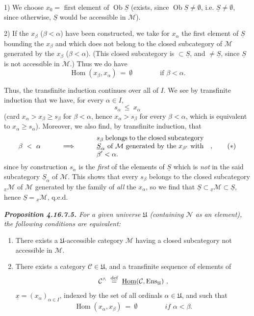 \documentclass[11pt]{article}
\newcommand{\printedpage}[1]{\marginpar{\footnotesize p.~#1}}
\newcommand{\msp}[1]{\marginpar{\footnotesize [#1]}}
\newcommand{\Ob}{\operatorname{Ob}}
\newcommand{\Hom}{\operatorname{Hom}}
\newcommand{\cM}{\mathcal{M}}
\newcommand{\cC}{\mathcal{C}}
\newcommand{\uS}{\underline{S}}
\newcommand{\U}{\mathfrak{U}}
\begin{document}
1) We choose $x_0 =$ first element of $\Ob \uS$ (exists, since $\Ob \uS \neq \emptyset$, i.e. $\uS \neq \emptyset$, since otherwise, $\uS$ would be accessible in $\cM$).

2) If the $x_\beta$ ($\beta < \alpha$) have been constructed, we take for $x_\alpha$ the first element of $\uS$ bounding the $x_\beta$ and which does not belong to the closed subcategory of $\cM$ generated by the $x_\beta$ ($\beta < \alpha$). (This closed subcategory is $\subset \uS$, and $\neq \uS$, since $\uS$ is not accessible in $\cM$.) Thus we do have
\[
\Hom(x_\beta, x_\alpha) \ =\ \emptyset \qquad\qquad \text{if } \beta < \alpha.
\]

\printedpage{187}

\msp{page 483}
Thus, the transfinite induction continues over all of $I$. We see by transfinite induction that we have, for every $\alpha \in I$,
\[
s_\alpha \ \leqslant\ x_\alpha
\]
(card $x_\alpha > x_\beta \geqslant s_\beta$ for $\beta < \alpha$, hence $x_\alpha > s_\beta$ for every $\beta < \alpha$, which is equivalent to $x_\alpha \geqslant s_\alpha$). Moreover, we also find, by transfinite induction, that
\[
\beta \ <\ \alpha \qquad\quad \Longrightarrow \qquad\quad
\text{\parbox[c]{5.5cm}{$s_\beta$ belongs to the closed subcategory $\uS_\alpha$ of $\cM$ generated by the $x_{\beta'}$ with $\beta' < \alpha$.}}
\quad ,
\tag*{$(*)$}
\]
since by construction $s_\alpha$ is the \textit{first} of the elements of $\uS$ which is \textit{not} in the said subcategory $\uS_\alpha$ of $\cM$. This shows that every $s_\beta$ belongs to the closed subcategory ${}_{\underline{x}}\cM$ of $\cM$ generated by the family of \textit{all} the $x_\alpha$, so we find that $\uS \subset {}_{\underline{x}}\cM \subset \uS$, hence $\uS = {}_{\underline{x}}\cM$, q.e.d.

\begingroup\itshape
\noindent\textbf{\upshape Proposition 4.16.7.5.} For a given universe $\U$ (containing $\mathcal{N}$ as an element), the following conditions are equivalent:
\begin{enumerate}[label={}]
\item[1)] There exists a $\U$-accessible category $\cM$ having a closed subcategory not accessible %
\msp{page 484}
in $\cM$.
\item[b)] There exists a category $\cC \in \U$, and a transfinite sequence of elements of
\[
\cC^\wedge \ \overset{\text{\upshape def}}{=}\ \underline{\mathrm{Hom}}(\cC, \mathrm{Ens}_{\U}) \ ,
\]
$\underline{x} = (x_\alpha)_{\alpha\in I}$, indexed by the set of all ordinals $\alpha \in \U$, and such that
\[
\Hom(x_\alpha, x_\beta) \ =\ \emptyset \qquad\qquad \textit{if } \alpha < \beta.
\]
\end{enumerate}
\endgroup
\end{document}
